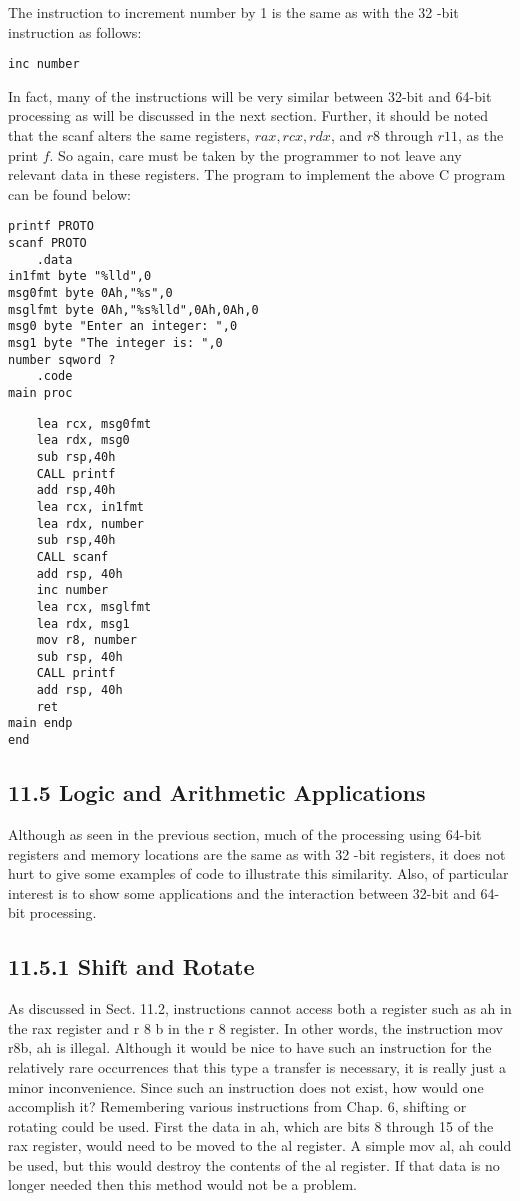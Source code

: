 \documentclass[10pt]{article}
\begin{document}
The instruction to increment number by 1 is the same as with the 32 -bit instruction as follows:

\begin{verbatim}
inc number
\end{verbatim}

In fact, many of the instructions will be very similar between 32-bit and 64-bit processing as will be discussed in the next section. Further, it should be noted that the scanf alters the same registers, $r a x, r c x, r d x$, and $r 8$ through $r 11$, as the print $f$. So again, care must be taken by the programmer to not leave any relevant data in these registers. The program to implement the above C program can be found below:

\begin{verbatim}
printf PROTO
scanf PROTO
    .data
in1fmt byte "%lld",0
msg0fmt byte 0Ah,"%s",0
msglfmt byte 0Ah,"%s%lld",0Ah,0Ah,0
msg0 byte "Enter an integer: ",0
msg1 byte "The integer is: ",0
number sqword ?
    .code
main proc
\end{verbatim}

\begin{verbatim}
    lea rcx, msg0fmt
    lea rdx, msg0
    sub rsp,40h
    CALL printf
    add rsp,40h
    lea rcx, in1fmt
    lea rdx, number
    sub rsp,40h
    CALL scanf
    add rsp, 40h
    inc number
    lea rcx, msglfmt
    lea rdx, msg1
    mov r8, number
    sub rsp, 40h
    CALL printf
    add rsp, 40h
    ret
main endp
end
\end{verbatim}

\subsection*{11.5 Logic and Arithmetic Applications}
Although as seen in the previous section, much of the processing using 64-bit registers and memory locations are the same as with 32 -bit registers, it does not hurt to give some examples of code to illustrate this similarity. Also, of particular interest is to show some applications and the interaction between 32-bit and 64-bit processing.

\subsection*{11.5.1 Shift and Rotate}
As discussed in Sect. 11.2, instructions cannot access both a register such as ah in the rax register and r 8 b in the r 8 register. In other words, the instruction mov r8b, ah is illegal. Although it would be nice to have such an instruction for the\\
relatively rare occurrences that this type a transfer is necessary, it is really just a minor inconvenience. Since such an instruction does not exist, how would one accomplish it? Remembering various instructions from Chap. 6, shifting or rotating could be used. First the data in ah, which are bits 8 through 15 of the rax register, would need to be moved to the al register. A simple mov al, ah could be used, but this would destroy the contents of the al register. If that data is no longer needed then this method would not be a problem.
\end{document}
